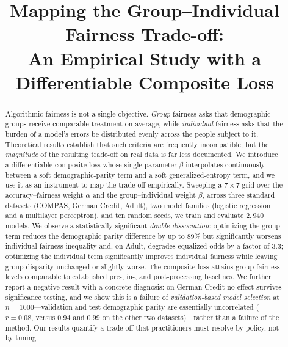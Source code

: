 \documentclass[conference]{IEEEtran}
\begin{document}
\title{Mapping the Group--Individual Fairness Trade-off:\\
An Empirical Study with a Differentiable Composite Loss}

\author{
}

\maketitle

\begin{abstract}
Algorithmic fairness is not a single objective. \emph{Group} fairness asks
that demographic groups receive comparable treatment on average, while
\emph{individual} fairness asks that the burden of a model's errors be
distributed evenly across the people subject to it. Theoretical results
establish that such criteria are frequently incompatible, but the
\emph{magnitude} of the resulting trade-off on real data is far less
documented. We introduce a differentiable composite loss whose single
parameter $\beta$ interpolates continuously between a soft demographic-parity
term and a soft generalized-entropy term, and we use it as an instrument to
map the trade-off empirically. Sweeping a $7\times7$ grid over the
accuracy--fairness weight $\alpha$ and the group--individual weight $\beta$,
across three standard datasets (COMPAS, German Credit, Adult), two model
families (logistic regression and a multilayer perceptron), and ten random
seeds, we train and evaluate $2{,}940$ models. We observe a statistically
significant \emph{double dissociation}: optimizing the group term reduces the
demographic parity difference by up to $89\%$ but significantly worsens
individual-fairness inequality and, on Adult, degrades equalized odds by a
factor of $3.3$; optimizing the individual term significantly improves
individual fairness while leaving group disparity unchanged or slightly worse.
The composite loss attains group-fairness levels comparable to established
pre-, in-, and post-processing baselines. We further report a negative result
with a concrete diagnosis: on German Credit no effect survives significance
testing, and we show this is a failure of \emph{validation-based model
selection} at $n=1000$---validation and test demographic parity are
essentially uncorrelated ($r=0.08$, versus $0.94$ and $0.99$ on the other two
datasets)---rather than a failure of the method. Our results quantify a
trade-off that practitioners must resolve by policy, not by tuning.
\end{abstract}
\end{document}
